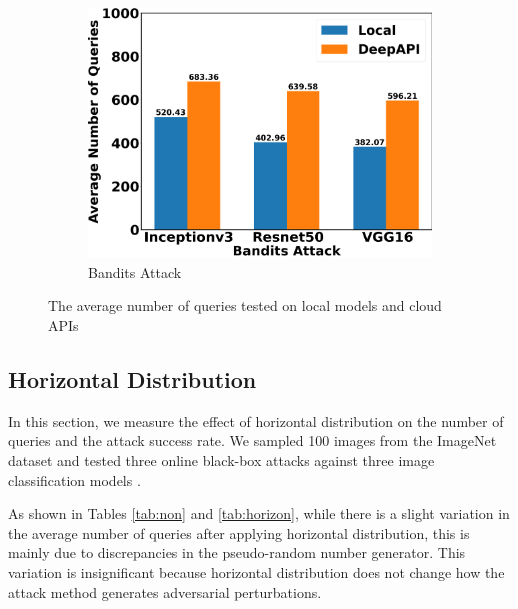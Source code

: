 \begin{figure}[bth]
\begin{subfigure}[b]{0.31\textwidth}
    \includegraphics[width=\textwidth]{figures/chapter_classification/bandits_number_of_queries.png}
    \caption{Bandits Attack}
    \label{fig:bandits_queries}
\end{subfigure}
\caption{The average number of queries tested on local models and cloud APIs}
\label{fig.queries}
\end{figure}


\subsection{Horizontal Distribution}

In this section, we measure the effect of horizontal distribution on the number of queries and the attack success rate. We sampled 100 images from the ImageNet dataset \citep{moore2020fiftyone} and tested three online black-box attacks against three image classification models \citep{chollet2015keras}.

As shown in Tables \ref{tab:non} and \ref{tab:horizon}, while there is a slight variation in the average number of queries after applying horizontal distribution, this is mainly due to discrepancies in the pseudo-random number generator. This variation is insignificant because horizontal distribution does not change how the attack method generates adversarial perturbations.

